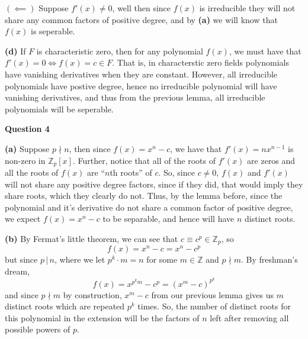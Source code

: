 \documentclass[10pt]{article}
\newcommand{\Z}{\mathbb{Z}}
\begin{document}
$(\impliedby)$ Suppose $f'(x) \neq 0$, well then since $f(x)$ is irreducible they will not share any common factors of positive degree, and by \textbf{(a)} we will know that $f(x)$ is seperable.

\textbf{(d)} If $F$ is characteristic zero, then for any polynomial $f(x)$, we must have that $f'(x) = 0 \iff f(x) = c \in F$. That is, in characterstic zero fields polynomials have vanishing derivatives when they are constant. However, all irreducible polynomials have postive degree, hence no irreducible polynomial will have vanishing derivatives, and thus from the previous lemma, all irreducible polynomials will be seperable.

\newpage
\textbf{Question 4}

\textbf{(a)} Suppose $p\nmid n$, then since $f(x) = x^{n} - c$, we have that $f'(x) = nx^{n-1}$ is non-zero in $\Z_{p}[x]$. Further, notice that all of the roots of $f'(x)$ are zeros and all the roots of $f(x)$ are ``$n$th roots'' of $c$. So, since $c\neq 0$, $f(x)$ and $f'(x)$ will not share any positive degree factors, since if they did, that would imply they share roots, which they clearly do not. Thus, by the lemma before, since the polynomial and it's derivative do not share a common factor of positive degree, we expect $f(x) = x^{n} - c$ to be separable, and hence will have $n$ distinct roots.

\textbf{(b)} By Fermat's little theorem, we can see that $c \equiv c^{p} \in \Z_{p}$, so
\[ f(x) = x^{n} - c = x^{n} - c^{p}\]
but since $p\, |\, n$, where we let $p^{k}\cdot m = n$ for some $m\in \Z$ and $p \nmid m$. By freshman's dream, 
\[ f(x) = x^{p^{k}m} - c^{p} = (x^{m} - c)^{p^{k}}\]
and since $p\nmid m$ by construction, $x^{m} - c$ from our previous lemma gives us $m$ distinct roots which are repeated $p^{k}$ times. So, the number of distinct roots for this polynomial in the extension will be the factors of $n$ left after removing all possible powers of $p$.
\end{document}
